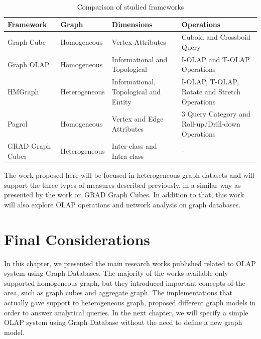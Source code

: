 \begin{table}[!ht]
\setlength\extrarowheight{2pt}
\caption{Comparison of studied frameworks}
\label{tb:table1}
\begin{tabularx}{\textwidth}{|Y|Z|Z|Z|}
\hline
{}\textbf{Framework} & \textbf{Graph} & \textbf{Dimensions} & \textbf{Operations}\\\hline
{ Graph Cube} & Homogeneous & Vertex Attributes & Cuboid and Crossboid Query\\\hline
{ Graph OLAP} & Homogeneous & Informational and Topological & I-OLAP and T-OLAP Operations\\\hline
{ HMGraph} & Heterogeneous & Informational, Topological and Entity & I-OLAP, T-OLAP, Rotate and Stretch Operations\\\hline
{ Pagrol} & Homogeneous & Vertex and Edge Attributes & 3 Query Category and Roll-up/Drill-down Operations \\ \hline
{ GRAD Graph Cubes} & Heterogeneous & Inter-class and Intra-class & - \\ \hline
\end{tabularx}
\end{table}

The work proposed here will be focused in heterogeneous graph datasets and will support the three types of measures described previously, in a similar way as presented by the work on GRAD Graph Cubes. In addition to that, this work will also explore OLAP operations and network analysis on graph databases.

\section{Final Considerations}

In this chapter, we presented the main research works published related to OLAP system using Graph Databases. The majority of the works available only supported homogeneous graph, but they introduced important concepts of the area, such as graph cubes and aggregate graph. The implementations that actually gave support to heterogeneous graph, proposed different graph models in order to answer analytical queries. In the next chapter, we will specify a simple OLAP system using Graph Database without the need to define a new graph model.
